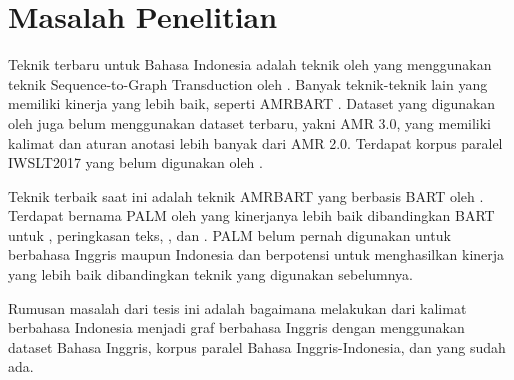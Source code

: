 \section{Masalah Penelitian}

Teknik \crosslingual{} \amrparsing{} terbaru untuk Bahasa Indonesia adalah teknik oleh \textcite{putra2022} yang menggunakan teknik Sequence-to-Graph Transduction oleh .
Banyak teknik-teknik lain yang memiliki kinerja \amrparsing{} yang lebih baik, seperti AMRBART .
Dataset yang digunakan oleh \textcite{putra2022} juga belum menggunakan dataset terbaru, yakni AMR 3.0, yang memiliki kalimat dan aturan anotasi lebih banyak dari AMR 2.0.
Terdapat korpus paralel IWSLT2017  yang belum digunakan oleh \textcite{putra2022}.

Teknik \amrparsing{} terbaik saat ini adalah teknik AMRBART yang berbasis  BART oleh \textcite{lewis2020}.
Terdapat  bernama PALM oleh \textcite{bi2020} yang kinerjanya lebih baik dibandingkan BART untuk  , peringkasan teks, , dan .
 PALM belum pernah digunakan untuk \amrparsing{} berbahasa Inggris maupun Indonesia dan berpotensi untuk menghasilkan kinerja yang lebih baik dibandingkan teknik yang digunakan sebelumnya.

Rumusan masalah dari tesis ini adalah bagaimana melakukan \amrparsing{} dari kalimat berbahasa Indonesia menjadi graf \AMR{} berbahasa Inggris dengan menggunakan dataset \AMR{} Bahasa Inggris, korpus paralel Bahasa Inggris-Indonesia, dan \multil{}  yang sudah ada.
